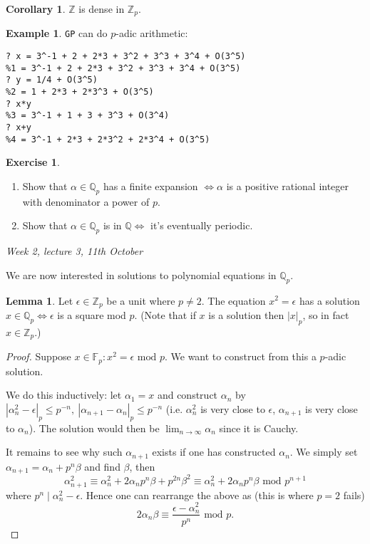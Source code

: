 \documentclass{article}
\newcommand{\F}{\mathbb{F}}
\newcommand{\Z}{\mathbb{Z}}
\newcommand{\Q}{\mathbb{Q}}
\newcommand{\Mod}{\text{ mod }}
\theoremstyle{definition}
\newtheorem{lemma}[defn]{Lemma}
\newtheorem{coro}[defn]{Corollary}
\newtheorem{example}[defn]{Example}
\newtheorem{exe}[defn]{Exercise}
\begin{document}
\begin{coro}
$\Z$ is dense in $\Z_p$.
\end{coro}

\begin{example}
\texttt{GP} can do $p$-adic arithmetic:

\begin{lstlisting}
? x = 3^-1 + 2 + 2*3 + 3^2 + 3^3 + 3^4 + O(3^5)
%1 = 3^-1 + 2 + 2*3 + 3^2 + 3^3 + 3^4 + O(3^5)
? y = 1/4 + O(3^5)
%2 = 1 + 2*3 + 2*3^3 + O(3^5)
? x*y
%3 = 3^-1 + 1 + 3 + 3^3 + O(3^4)
? x+y
%4 = 3^-1 + 2*3 + 2*3^2 + 2*3^4 + O(3^5)
\end{lstlisting}
\end{example}

\begin{exe}
\begin{enumerate}
\item Show that $\alpha\in\Q_p$ has a finite expansion $\iff\alpha$ is a positive rational integer with denominator a power of $p$.
\item Show that $\alpha\in\Q_p$ is in $\Q\iff$ it's eventually periodic.
\end{enumerate}
\end{exe}

\begin{flushright}
\textit{Week 2, lecture 3, 11th October}
\end{flushright}

We are now interested in solutions to polynomial equations in $\Q_p$.

\begin{lemma}
Let $\epsilon\in\Z_p$ be a unit where $p\neq 2$. The equation $x^2=\epsilon$ has a solution $x\in\Q_p \iff \epsilon$ is a square mod $p$. (Note that if $x$ is a solution then $|x|_p$, so in fact $x\in\Z_p$.)
\end{lemma}
\begin{proof}
Suppose $x\in\F_p:x^2=\epsilon\Mod p$. We want to construct from this a $p$-adic solution.

We do this inductively: let $\alpha_1=x$ and construct $\alpha_n$ by $|\alpha_n^2-\epsilon|_p\leq p^{-n},\ |\alpha_{n+1}-\alpha_n|_p\leq p^{-n}$ (i.e. $\alpha_n^2$ is very close to $\epsilon$, $\alpha_{n+1}$ is very close to $\alpha_n$). The solution would then be $\lim_{n\rightarrow\infty}\alpha_n$ since it is Cauchy.

It remains to see why such $\alpha_{n+1}$ exists if one has constructed $\alpha_n$. We simply set $\alpha_{n+1}=\alpha_n+p^n\beta$ and find $\beta$, then
\[
\alpha_{n+1}^2\equiv \alpha_n^2+2\alpha_np^n\beta+p^{2n}\beta^2\equiv \alpha_n^2+2\alpha_np^n\beta\Mod p^{n+1}
\]
where $p^n\mid \alpha_n^2-\epsilon$. Hence one can rearrange the above as (this is where $p=2$ fails)
\[
2\alpha_n\beta\equiv \frac{\epsilon-\alpha_n^2}{p^n}\Mod p.
\]
\end{proof}
\end{document}
